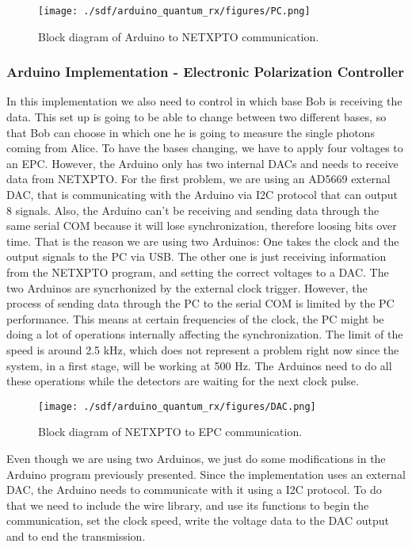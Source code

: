 \begin{refsection}
		\begin{figure}[H]
			\centering
			\texttt{[image: ./sdf/arduino\_quantum\_rx/figures/PC.png]}
			\caption{Block diagram of Arduino to NETXPTO communication.}
			\label{fig:netxpto}
		\end{figure}
	
	
	\subsubsection{Arduino Implementation - Electronic Polarization Controller }
	In this implementation we also need to control in which base Bob is receiving the data. This set up is going to be able to change between two different bases, so that Bob can choose in which one he is going to measure the single photons coming from Alice. To have the bases changing, we have to apply four voltages to an EPC. However, the Arduino only has two internal DACs and needs to receive data from NETXPTO. For the first problem, we are using an AD5669 external DAC, that is communicating with the Arduino via I2C protocol that can output 8 signals. Also, the Arduino can't be receiving and sending data through the same serial COM because it will lose synchronization, therefore loosing bits over time. That is the reason we are using two Arduinos: One takes the clock and the output signals to the PC via USB. The other one is just receiving information from the NETXPTO program, and setting the correct voltages to a DAC. The two Arduinos are syncrhonized by the external clock trigger. However, the process of sending data through the PC to the serial COM  is limited by the PC performance. This means at certain frequencies of the clock, the PC might be doing a lot of operations internally affecting the synchronization. The limit of the speed is around 2.5 kHz, which does not represent a problem right now since the system, in a first stage, will be working at 500 Hz. The Arduinos need to do all these operations while the detectors are waiting for the next clock pulse. 
	
	
	\begin{figure}[H]
		
		\centering
		\texttt{[image: ./sdf/arduino\_quantum\_rx/figures/DAC.png]}
		\caption{Block diagram of NETXPTO to EPC communication.}
		\label{fig:netxpto}
		
	\end{figure}
	
	Even though we are using two Arduinos, we just do some modifications in the Arduino program previously presented. Since the implementation uses an external DAC, the Arduino needs to communicate with it using a I2C protocol. To do that we need to include the wire library, and use its functions to begin the communication, set the clock speed, write the voltage data to the DAC output and to end the transmission.
	

\end{refsection}

